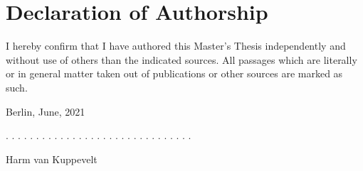 \documentclass[a4paper,11pt]{article}
\newcommand{\thesistype}{Master's Thesis}
\newcommand{\thesisauthor}{Harm van Kuppevelt}
\newcommand{\thesisdate}{June, 2021}
\begin{document}
\newpage




\newpage
\thispagestyle{empty}
\hypertarget{declaration-of-authorship}{%
\section*{Declaration of Authorship}\label{declaration-of-authorship}}

I hereby confirm that I have authored this \thesistype{} independently and
without use of others than the indicated sources. All passages which are
literally or in general matter taken out of publications or other sources are
marked as such.
\vspace{1cm}

Berlin, \thesisdate{}
\vspace{3cm}

. . . . . . . . . . . . . . . . . . . . . . . . . . . . . . .
\vspace{0.1cm}

\thesisauthor{}
\end{document}
